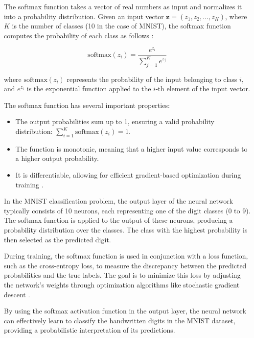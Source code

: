 The softmax function takes a vector of real numbers as input and normalizes it into a probability distribution. Given an input vector $\mathbf{z} = (z_1, z_2, \dots, z_K)$, where $K$ is the number of classes (10 in the case of MNIST), the softmax function computes the probability of each class as follows \cite{goodfellow2016deep}:

\begin{equation}
\text{softmax}(z_i) = \frac{e^{z_i}}{\sum_{j=1}^{K} e^{z_j}}
\end{equation}

where $\text{softmax}(z_i)$ represents the probability of the input belonging to class $i$, and $e^{z_i}$ is the exponential function applied to the $i$-th element of the input vector.

The softmax function has several important properties:

\begin{itemize}
  \item The output probabilities sum up to 1, ensuring a valid probability distribution: $\sum_{i=1}^{K} \text{softmax}(z_i) = 1$.
  \item The function is monotonic, meaning that a higher input value corresponds to a higher output probability.
  \item It is differentiable, allowing for efficient gradient-based optimization during training \cite{bishop2006pattern}.
\end{itemize}

In the MNIST classification problem, the output layer of the neural network typically consists of 10 neurons, each representing one of the digit classes (0 to 9). The softmax function is applied to the output of these neurons, producing a probability distribution over the classes. The class with the highest probability is then selected as the predicted digit.

During training, the softmax function is used in conjunction with a loss function, such as the cross-entropy loss, to measure the discrepancy between the predicted probabilities and the true labels. The goal is to minimize this loss by adjusting the network's weights through optimization algorithms like stochastic gradient descent \cite{lecun2015deep}.

By using the softmax activation function in the output layer, the neural network can effectively learn to classify the handwritten digits in the MNIST dataset, providing a probabilistic interpretation of its predictions.

